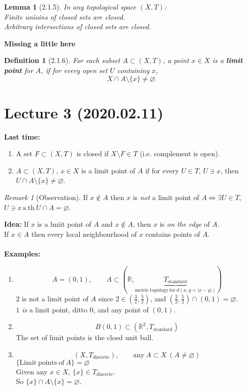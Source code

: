 \documentclass{article}
\newcommand{\sth}{\mathrm{s.th}\ }
\newcommand{\R}{\mathbb{R}}
\newcommand{\abs}[1]{\left|#1\right|}
\renewcommand{\emptyset}{\varnothing}
\newtheorem{slemma}[stheorem]{Lemma}
\newtheorem{sdefinition}[stheorem]{Definition}
\theoremstyle{remark}
\theoremstyle{example}
\theoremstyle{examples}
\newtheorem*{remark}{Remark}
\begin{document}
	\begin{slemma}[2.1.5]
		In any topological space $(X,T)$:\\
		Finite unioins of closed sets are closed.\\
		Arbitrary intersections of closed sets are closed.
	\end{slemma}

	\textbf{Missing a little here}
	
	\begin{sdefinition}[2.1.6]
		For each subset $A \subset (X,T)$, a point $x \in X$ is a \textbf{limit point} for $A$, if for every open set $U$ containing $x$, \[X \cap A \setminus \{x\} \neq \emptyset \]
	\end{sdefinition}
	\pagebreak

	\section*{Lecture 3 (2020.02.11)}
	\textbf{Last time:}
	\begin{enumerate}
		\item A set $F \subset (X,T)$ is closed if $X \setminus F \in T$ (i.e. complement is open).
		\item $A \subset (X,T)$, $x \in X$ is a limit point of $A$ if for every $U \in T$, $U \ni x$, then $U \cap A \setminus \{x\} \neq \emptyset$.
	\end{enumerate}
	
	\begin{remark}[Observation]
		\label{notinnotlimit}
		If $x \notin A$ then $x$ is \textit{not} a limit point of $A \iff \exists U \in T$, $U \ni x\ \sth U \cap A = \emptyset$.
	\end{remark}

	\textbf{Idea:} If $x$ is a lmiit point of $A$ and $x \notin A$, then $x$ is \textit{on the edge} of $A$.\\
	If $x \in A$ then every local neighbourhood of $x$ contains points of $A$.\\
	\\
	\textbf{Examples:}
	\begin{enumerate}
		\item \[A=(0,1),\qquad A \subset (\R,\underbrace{T_{\mathrm{standard}}}_{\mathrm{metric\ topology\ for\ } d(x,y=\abs{x-y})})\]
		$2$ is not a limit point of $A$ since $2 \in (\frac32,\frac52)$, and $(\frac32,\frac52) \cap (0,1)=\emptyset$.\\
		$1$ \textit{is} a limit point, ditto 0, and any point of $(0,1)$.
		
		\item \[B(0,1) \subset(\R^2,T_\mathrm{standard})\]
		The set of limit points is the cloed unit ball.

		\item \[(X,T_\mathrm{discrete}),\qquad \mathrm{any}\ A \subset X\ (A \neq \emptyset)\]
		$\{\mathrm{Limit\ points\ of}\ A\} = \emptyset$\\
		Given any $x \in X$, $\{x\} \in T_\mathrm{discrete}.$\\
		So $\{x\} \cap A \setminus\{x\}=\emptyset$.
	\end{enumerate}
\end{document}
